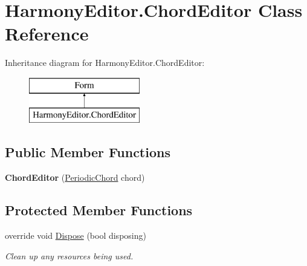 \hypertarget{class_harmony_editor_1_1_chord_editor}{\section{Harmony\+Editor.\+Chord\+Editor Class Reference}
\label{class_harmony_editor_1_1_chord_editor}
}
Inheritance diagram for Harmony\+Editor.\+Chord\+Editor\+:\begin{figure}[H]
\begin{center}
\leavevmode
\includegraphics[height=2.000000cm]{class_harmony_editor_1_1_chord_editor}
\end{center}
\end{figure}
\subsection*{Public Member Functions}
\begin{DoxyCompactItemize}
\item 
\hypertarget{class_harmony_editor_1_1_chord_editor_a700c141670055da86cc0503f39c9f9fe}{{\bfseries Chord\+Editor} (\hyperlink{class_periodic_chords_1_1_periodic_chord}{Periodic\+Chord} chord)}\label{class_harmony_editor_1_1_chord_editor_a700c141670055da86cc0503f39c9f9fe}

\end{DoxyCompactItemize}
\subsection*{Protected Member Functions}
\begin{DoxyCompactItemize}
\item 
override void \hyperlink{class_harmony_editor_1_1_chord_editor_af2ec925f93bfb82bb1f231552a0a8984}{Dispose} (bool disposing)
\begin{DoxyCompactList}\small\item\em Clean up any resources being used. \end{DoxyCompactList}\end{DoxyCompactItemize}
